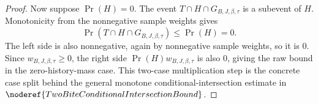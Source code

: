 \begin{proof}
Now suppose \(\Pr(H)=0\).  The event \(T\cap H\cap G_{B,J,\beta,\tau}\) is a
subevent of \(H\).  Monotonicity from the nonnegative sample weights gives
\[
\Pr(T\cap H\cap G_{B,J,\beta,\tau})\le \Pr(H)=0.
\]
The left side is also nonnegative, again by nonnegative sample weights, so it
is \(0\).  Since \(w_{B,J,\beta,\tau}\ge0\), the right side
\(\Pr(H)w_{B,J,\beta,\tau}\) is also \(0\), giving the raw bound in the
zero-history-mass case.  This two-case multiplication step is the concrete
case split behind the general monotone conditional-intersection estimate in
\(\noderef{TwoBiteConditionalIntersectionBound}\).
\end{proof}
